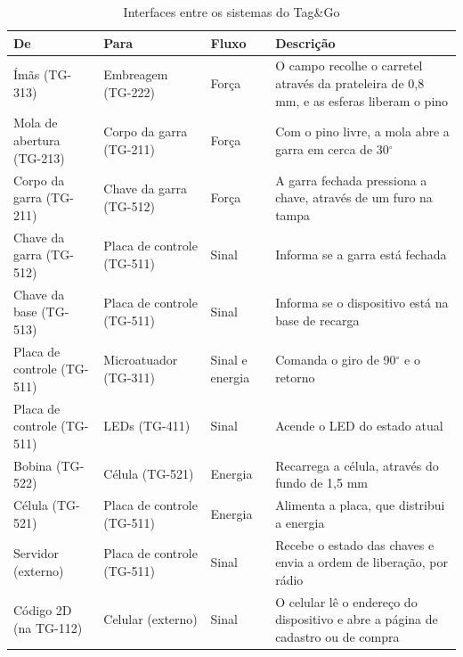 \begin{table}[htbp]
    \centering
    \caption{Interfaces entre os sistemas do Tag\&Go}
    \label{tab:conj_interfaces}
    \footnotesize
    \renewcommand{\arraystretch}{1.3}
    \begin{tabularx}{\textwidth}{@{}
        >{\RaggedRight\arraybackslash}p{3.0cm}
        >{\RaggedRight\arraybackslash}p{3.0cm}
        >{\RaggedRight\arraybackslash}p{1.5cm}
        >{\RaggedRight\arraybackslash}X@{}}
        \toprule
        \textbf{De} & \textbf{Para} & \textbf{Fluxo} & \textbf{Descrição} \\
        \midrule
        Ímãs (TG-313) & Embreagem (TG-222) & Força & O campo recolhe o carretel através da prateleira de 0,8 mm, e as esferas liberam o pino \\
        Mola de abertura (TG-213) & Corpo da garra (TG-211) & Força & Com o pino livre, a mola abre a garra em cerca de 30$^\circ$ \\
        Corpo da garra (TG-211) & Chave da garra (TG-512) & Força & A garra fechada pressiona a chave, através de um furo na tampa \\
        Chave da garra (TG-512) & Placa de controle (TG-511) & Sinal & Informa se a garra está fechada \\
        Chave da base (TG-513) & Placa de controle (TG-511) & Sinal & Informa se o dispositivo está na base de recarga \\
        Placa de controle (TG-511) & Microatuador (TG-311) & Sinal e energia & Comanda o giro de 90$^\circ$ e o retorno \\
        Placa de controle (TG-511) & LEDs (TG-411) & Sinal & Acende o LED do estado atual \\
        Bobina (TG-522) & Célula (TG-521) & Energia & Recarrega a célula, através do fundo de 1,5 mm \\
        Célula (TG-521) & Placa de controle (TG-511) & Energia & Alimenta a placa, que distribui a energia \\
        Servidor (externo) & Placa de controle (TG-511) & Sinal & Recebe o estado das chaves e envia a ordem de liberação, por rádio \\
        Código 2D (na TG-112) & Celular (externo) & Sinal & O celular lê o endereço do dispositivo e abre a página de cadastro ou de compra \\
        \bottomrule
    \end{tabularx}
\end{table}

